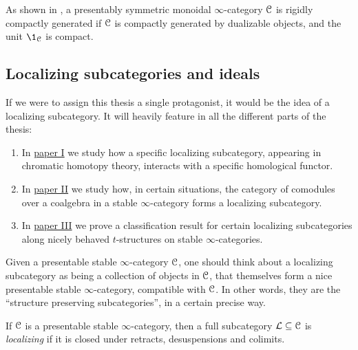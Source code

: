 \begin{remark}
    \label{ch0:rm:compacts-equal-dualizable}
    As shown in \cite[2.1.3]{hovey-palmiery-strickland_97}, a presentably symmetric monoidal $\infty$-category $\EuScript{C}$ is rigidly compactly generated if $\EuScript{C}$ is compactly generated by dualizable objects, and the unit $\1_\C$ is compact. 
\end{remark}







\subsection{Localizing subcategories and ideals}
\label{ch0:ssec:localizing-subcategories-and-ideals}

If we were to assign this thesis a single protagonist, it would be the idea of a localizing subcategory. It will heavily feature in all the different parts of the thesis: 
\begin{enumerate}
    \item In \hyperref[ch1]{paper I} we study how a specific localizing subcategory, appearing in chromatic homotopy theory, interacts with a specific homological functor.
    \item In \hyperref[ch2]{paper II} we study how, in certain situations, the category of comodules over a coalgebra in a stable $\infty$-category forms a localizing subcategory. 
    \item In \hyperref[ch3]{paper III} we prove a classification result for certain localizing subcategories along nicely behaved $t$-structures on stable $\infty$-categories. 
\end{enumerate}

Given a presentable stable $\infty$-category $\EuScript{C}$, one should think about a localizing subcategory as being a collection of objects in $\EuScript{C}$, that themselves form a nice presentable stable $\infty$-category, compatible with $\EuScript{C}$. In other words, they are the ``structure preserving subcategories'', in a certain precise way. 

\begin{definition}
    \label{ch0:def:localizing-subcategory}
    If $\EuScript{C}$ is a presentable stable $\infty$-category, then a full subcategory $\mathcal{L}\subseteq \EuScript{C}$ is \emph{localizing} if it is closed under retracts, desuspensions and colimits. 
\end{definition}

